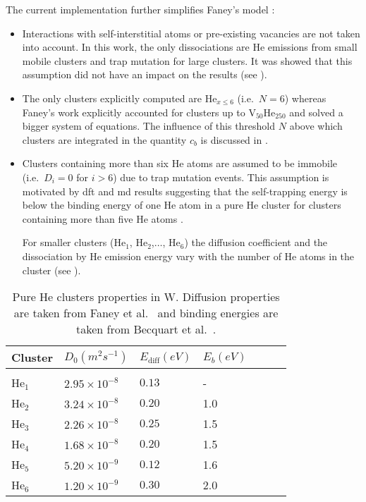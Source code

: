 The current implementation further simplifies Faney's model :
\begin{itemize}
    \item Interactions with \gls{self-interstitial} atoms or pre-existing vacancies are not taken into account.
    In this work, the only dissociations are He emissions from small mobile clusters and \gls{trap mutation} for large clusters.
    It was showed that this assumption did not have an impact on the results (see ).
    \item The only clusters explicitly computed are $\mathrm{He}_{x \leq 6}$ (i.e.\ $N=6$) whereas Faney's work explicitly accounted for clusters up to $\mathrm{V}_{50}\mathrm{He}_{250}$ and solved a bigger system of equations.
    The influence of this threshold $N$ above which clusters are integrated in the quantity $c_b$ is discussed in .
    \item Clusters containing more than six \gls{He} atoms are assumed to be immobile (i.e.\ $D_i = 0$ for $i>6$) due to \gls{trap mutation} events.
    This assumption is motivated by \gls{dft} and \gls{md} results suggesting that the \gls{self-trapping} energy is below the binding energy of one He atom in a pure He cluster for clusters containing more than five He atoms .

    For smaller clusters ($\mathrm{He}_1$, $\mathrm{He}_2$,$\ldots$, $\mathrm{He}_6$) the diffusion coefficient and the dissociation by He emission energy vary with the number of \gls{He} atoms in the cluster (see ).
\end{itemize}

\begin{table}
    \centering
    \begin{tabular}{L{1cm} R{2cm} R{1.6cm} R{1.1cm} R{1.6cm} R{1.1cm} R{2cm}}
        Cluster & $D_0 (\si{m^2 s^{-1}})$  & $E_\mathrm{diff} (\si{eV})$ &  $E_b (\si{eV})$   \\
        \hline
        \\
        He$_1$ & $2.95\times 10^{-8}$ & $0.13$ & - \\
        He$_2$ & $3.24\times 10^{-8}$ & $0.20$ & 1.0\\
        He$_3$ & $2.26\times 10^{-8}$ & $0.25$ & 1.5\\
        He$_4$ & $1.68\times 10^{-8}$ & $0.20$ & 1.5\\
        He$_5$ & $5.20\times 10^{-9}$ & $0.12$ & 1.6\\
        He$_6$ & $1.20\times 10^{-9}$ & $0.30$ & 2.0\\
    \end{tabular}
    \caption{Pure \gls{He} clusters properties in \gls{W}. Diffusion properties are taken from Faney et al.\ \cite{faney_spatially_2015} and binding energies are taken from Becquart et al.\ \cite{becquart_microstructural_2010}.}
\end{table}

